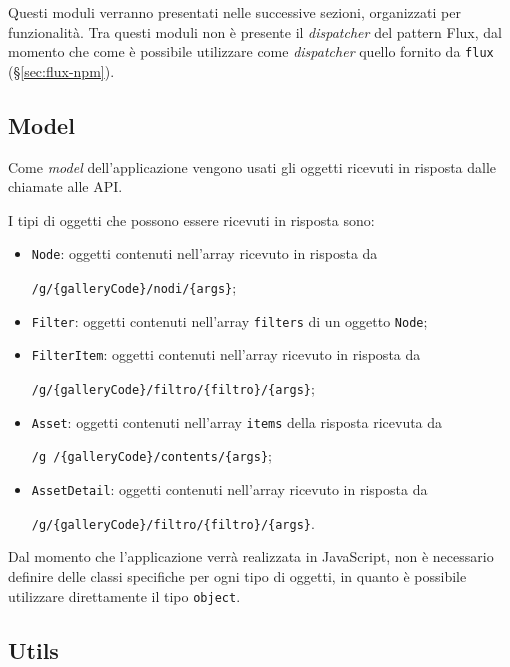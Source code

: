 Questi moduli verranno presentati nelle successive sezioni, organizzati per funzionalità.
Tra questi moduli non è presente il \textit{dispatcher} del pattern Flux, dal momento che come è possibile utilizzare come \textit{dispatcher} quello fornito da \texttt{flux} (§\ref{sec:flux-npm}).

\subsection{Model}

Come \textit{model} dell'applicazione vengono usati gli oggetti ricevuti in risposta dalle chiamate alle API.

I tipi di oggetti che possono essere ricevuti in risposta sono:
\begin{itemize}
\item \texttt{Node}: oggetti contenuti nell'array ricevuto in risposta da \begin{center}
\texttt{/g/\{galleryCode\}/nodi/\{args\}};
\end{center} 
\item \texttt{Filter}: oggetti contenuti nell'array \texttt{filters} di un oggetto \texttt{Node};
\item \texttt{FilterItem}: oggetti contenuti nell'array ricevuto in risposta da 
\begin{center}
\texttt{/g/\{galleryCode\}/filtro/\{filtro\}/\{args\}};
\end{center}
\item \texttt{Asset}: oggetti contenuti nell'array \texttt{items} della risposta ricevuta da 
\begin{center}
\texttt{/g /\{galleryCode\}/contents/\{args\}};
\end{center}
\item \texttt{AssetDetail}: oggetti contenuti nell'array ricevuto in risposta da
\begin{center}
\texttt{/g/\{galleryCode\}/filtro/\{filtro\}/\{args\}}.
\end{center}
\end{itemize}

Dal momento che l'applicazione verrà realizzata in JavaScript, non è necessario definire delle classi specifiche per ogni tipo di oggetti, in quanto è possibile utilizzare direttamente il tipo \texttt{object}.

\subsection{Utils}

